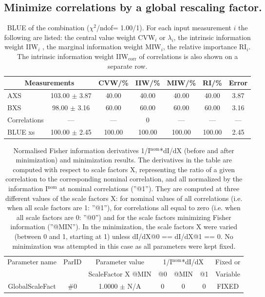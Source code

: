 \subsection{Minimize correlations by a global rescaling factor.}
\begin{table}[H]
\scriptsize
\begin{center}
\renewcommand{\arraystretch}{1.1}
\begin{tabular}{|lc|c|c|c|c|c|}
\hline
\multicolumn{2}{|c|}{Measurements} & CVW/\%  & IIW/\%  & MIW/\%  & RI/\%  & {\tiny Error}\\
\hline
AXS &     103.00 $\pm$       3.87 &      40.00 &      40.00 &      40.00 &      40.00 &       3.87\\
BXS &      98.00 $\pm$       3.16 &      60.00 &      60.00 &      60.00 &      60.00 &       3.16\\
Correlations & --- & --- &  0 & --- & --- & ---\\
\hline
BLUE {\tiny xs} &     100.00 $\pm$       2.45 &     100.00 &     100.00 &     100.00 &     100.00 &       2.45\\
\hline
\end{tabular}
\caption{BLUE of the combination ($\chi^2$/ndof=      1.00/1).
 For each input measurement $i$ the following are listed: the central value weight CVW$_i$ or $\lambda_i$, the intrinsic information weight IIW$_i$ , the marginal information weight MIW$_i$, the relative importance RI$_i$. The intrinsic information weight IIW$_{\mathrm{corr}}$ of correlations is also shown on a separate row.}
\renewcommand{\arraystretch}{1}
\end{center}
\end{table}
\begin{table}[H]
\scriptsize
\begin{center}
\renewcommand{\arraystretch}{1.1}
\begin{tabular}{|c|c|c|ccc|c|}
\hline
Parameter name & ParID & Parameter value &\multicolumn{3}{|c|}{1/I$^\mathrm{nom}$*dI/dX} & Fixed or\\
 & & ScaleFactor X @MIN & @0 & @MIN & @1 & Variable\\
\hline
 {\tiny GlobalScaleFact} & \#0 &    1.0000 $\pm$ N/A & 0 & 0 & 0 & FIXED \\
\hline
\end{tabular}
\renewcommand{\arraystretch}{1}
\caption{Normalised Fisher information derivatives 1/I$^\mathrm{nom}$*dI/dX (before and after minimization) and minimization results.  The derivatives in the table are computed with respect to scale factors X, representing the ratio of a given correlation to the corresponding nominal correlation, and all normalized by the information I$^\mathrm{nom}$ at nominal correlations (''@1''). They are computed at three different values of the scale factors X: for nominal values of all correlations (i.e. when all scale factors are 1: ''@1''), for correlations all equal to zero (i.e. when all scale factors are 0: ''@0'') and for the scale factors minimizing Fisher information (''@MIN''). In the minimization, the scale factors X were varied (between 0 and 1, starting at 1) unless dI/dX@0 == dI/dX@1 == 0. No minimization was attempted in this case as all parameters were kept fixed.}
\end{center}
\end{table}
